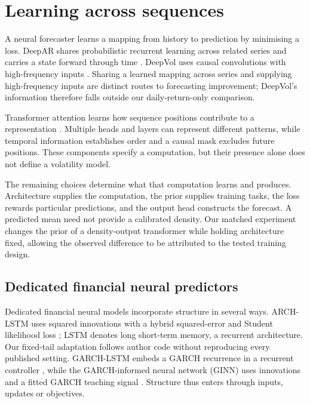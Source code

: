 \section{Learning across sequences}

A neural forecaster learns a mapping from history to prediction by minimising a loss. DeepAR shares probabilistic recurrent learning across related series and carries a state forward through time \citep{salinas2020deepar}. DeepVol uses causal convolutions with high-frequency inputs \citep{morenopino2024deepvol}. Sharing a learned mapping across series and supplying high-frequency inputs are distinct routes to forecasting improvement; DeepVol's information therefore falls outside our daily-return-only comparison.

Transformer attention learns how sequence positions contribute to a representation \citep{vaswani2017attention}. Multiple heads and layers can represent different patterns, while temporal information establishes order and a causal mask excludes future positions. These components specify a computation, but their presence alone does not define a volatility model.

The remaining choices determine what that computation learns and produces. Architecture supplies the computation, the prior supplies training tasks, the loss rewards particular predictions, and the output head constructs the forecast. A predicted mean need not provide a calibrated density. Our matched experiment changes the prior of a density-output transformer while holding architecture fixed, allowing the observed difference to be attributed to the tested training design.

\subsection{Dedicated financial neural predictors}

Dedicated financial neural models incorporate structure in several ways. ARCH-LSTM uses squared innovations with a hybrid squared-error and Student likelihood loss \citep{acevedo2026archlstm}; LSTM denotes long short-term memory, a recurrent architecture. Our fixed-tail adaptation follows author code without reproducing every published setting. GARCH-LSTM embeds a GARCH recurrence in a recurrent controller \citep{zhao2024garchnn}, while the GARCH-informed neural network (GINN) uses innovations and a fitted GARCH teaching signal \citep{xu2024ginn}. Structure thus enters through inputs, updates or objectives.

